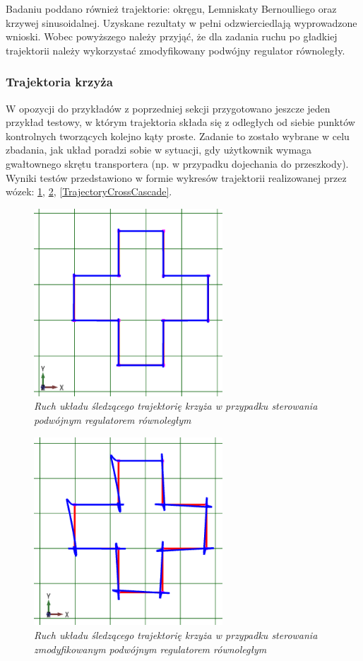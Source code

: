 \documentclass[12pt, twoside, openany]{report}
\theoremstyle{definition}
\begin{document}
Badaniu poddano również trajektorie: okręgu, Lemniskaty Bernoulliego oraz krzywej sinusoidalnej. Uzyskane rezultaty w pełni odzwierciedlają wyprowadzone wnioski. Wobec powyższego należy przyjąć, że dla zadania ruchu po gładkiej trajektorii należy wykorzystać zmodyfikowany podwójny regulator równoległy.

\subsubsection{Trajektoria krzyża}
W opozycji do przykładów z poprzedniej sekcji przygotowano jeszcze jeden przykład testowy, w którym trajektoria składa się z odległych od siebie punktów kontrolnych tworzących kolejno kąty proste. Zadanie to zostało wybrane w celu zbadania, jak układ poradzi sobie w sytuacji, gdy użytkownik wymaga gwałtownego skrętu transportera (np. w przypadku dojechania do przeszkody). Wyniki testów przedstawiono w formie wykresów trajektorii realizowanej przez wózek: \ref{TrajectoryCrossParallel}, \ref{TrajectoryCrossPD}, \ref{TrajectoryCrossCascade}.

\begin{figure}[H]
	\centering
		\includegraphics[width = 200pt]{TrajectoryCrossParallel} 
		\caption{\textit{Ruch układu śledzącego trajektorię krzyża w przypadku sterowania podwójnym regulatorem równoległym}}
		\label{TrajectoryCrossParallel}
\end{figure}

\begin{figure}[H]
	\centering
		\includegraphics[width = 200pt]{TrajectoryCrossPD} 
		\caption{\textit{Ruch układu śledzącego trajektorię krzyża w przypadku sterowania zmodyfikowanym podwójnym regulatorem równoległym}}
		\label{TrajectoryCrossPD}
\end{figure}
\end{document}
